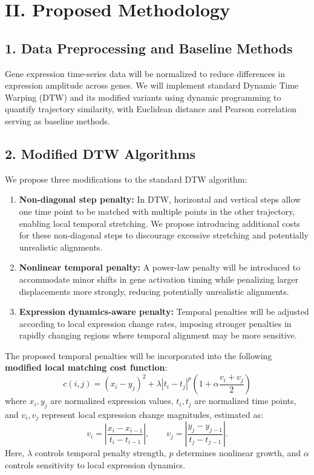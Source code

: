 \documentclass[11pt,a4paper]{article}
\begin{document}
\section*{II. Proposed Methodology}

\subsection*{1. Data Preprocessing and Baseline Methods}
Gene expression time-series data will be normalized to reduce differences in expression amplitude across genes. We will implement standard Dynamic Time Warping (DTW) and its modified variants using dynamic programming to quantify trajectory similarity, with Euclidean distance and Pearson correlation serving as baseline methods.

\subsection*{2. Modified DTW Algorithms}
We propose three modifications to the standard DTW algorithm:

\begin{enumerate}[label=\textbf{(\arabic*)}]
\item \textbf{Non-diagonal step penalty:} In DTW, horizontal and vertical steps allow one time point to be matched with multiple points in the other trajectory, enabling local temporal stretching. We propose introducing additional costs for these non-diagonal steps to discourage excessive stretching and potentially unrealistic alignments.

\item \textbf{Nonlinear temporal penalty:} A power-law penalty will be introduced to accommodate minor shifts in gene activation timing while penalizing larger displacements more strongly, reducing potentially unrealistic alignments.

\item \textbf{Expression dynamics-aware penalty:} Temporal penalties will be adjusted according to local expression change rates, imposing stronger penalties in rapidly changing regions where temporal alignment may be more sensitive.
\end{enumerate}

The proposed temporal penalties will be incorporated into the following \textbf{modified local matching cost function}:
\begin{equation}
\boxed{c(i,j)=(x_i-y_j)^2+\lambda |t_i-t_j|^p\left(1+\alpha\frac{v_i+v_j}{2}\right)}
\end{equation}
where $x_i,y_j$ are normalized expression values, $t_i,t_j$ are normalized time points, and $v_i,v_j$ represent local expression change magnitudes, estimated as:
\begin{equation}
 v_i=\left|\frac{x_i-x_{i-1}}{t_i-t_{i-1}}\right|,
 \qquad
 v_j=\left|\frac{y_j-y_{j-1}}{t_j-t_{j-1}}\right|.
\end{equation}
Here, $\lambda$ controls temporal penalty strength, $p$ determines nonlinear growth, and $\alpha$ controls sensitivity to local expression dynamics.
\end{document}
